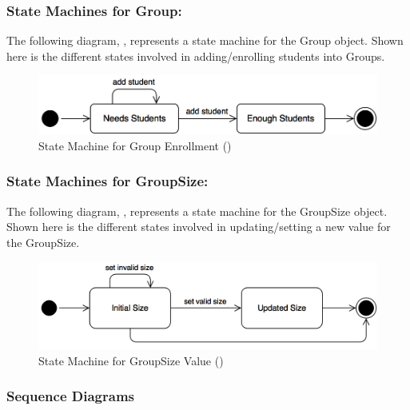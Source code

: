 \documentclass[12pt,letterpaper]{article}
\begin{document}
\subsubsection*{State Machines for Group:}

The following diagram, , represents a state machine for the Group object. Shown here is the different states involved in adding/enrolling students into Groups.

\begin{figure}[H]
	\centering{}
	\includegraphics[scale=0.3]{imgs/state/group-enrollment.png}
	\caption[ - State Machine for Group Enrollment]{State Machine for Group Enrollment ()}
\end{figure}

\subsubsection*{State Machines for GroupSize:}

The following diagram, , represents a state machine for the GroupSize object. Shown here is the different states involved in updating/setting a new value for the GroupSize.

\begin{figure}[H]
	\centering{}
	\includegraphics[scale=0.3]{imgs/state/group-size-value.png}
	\caption[ - State Machine for GroupSize Value]{State Machine for GroupSize Value ()}
\end{figure}

\subsubsection*{Sequence Diagrams}
\end{document}
